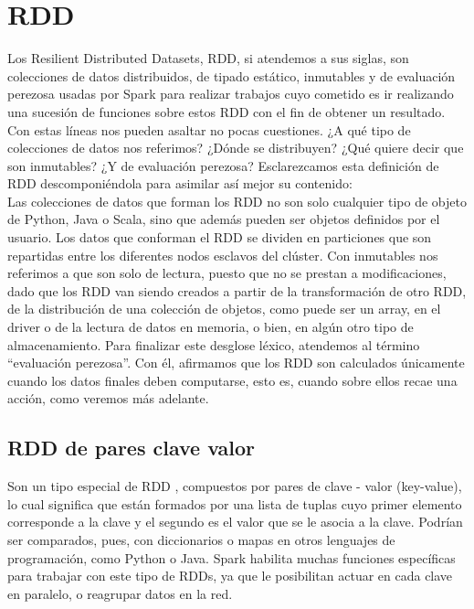\chapter{RDD}

Los Resilient Distributed Datasets, RDD, si atendemos a sus siglas, son colecciones de datos distribuidos, de tipado estático, inmutables y de evaluación perezosa usadas por Spark para realizar trabajos cuyo cometido es ir realizando una sucesión de funciones sobre estos RDD con el fin de obtener un resultado.\\
 
Con estas líneas nos pueden asaltar no pocas cuestiones. ¿A qué tipo de colecciones de datos nos referimos? ¿Dónde se distribuyen? ¿Qué quiere decir que son inmutables? ¿Y de evaluación perezosa? Esclarezcamos esta definición de RDD descomponiéndola para asimilar así mejor su contenido:\\
 
Las colecciones de datos que forman los RDD no son solo cualquier tipo de objeto de Python, Java o Scala, sino que  además pueden ser objetos definidos por el usuario. Los datos que conforman el RDD se dividen en particiones que son repartidas entre los diferentes nodos esclavos del clúster. Con inmutables nos referimos a que son solo de lectura, puesto que no se prestan a modificaciones, dado que los RDD van siendo creados a partir de la transformación de otro RDD, de la distribución de una colección de objetos, como puede ser un array, en el driver o de la lectura de datos en memoria, o bien, en algún otro tipo de almacenamiento. Para finalizar este desglose léxico, atendemos al término “evaluación perezosa”. Con él, afirmamos que los RDD son calculados únicamente cuando los datos finales deben computarse, esto es, cuando sobre ellos recae una acción, como veremos más adelante.\\

\section{RDD de pares clave valor}

Son un tipo especial de RDD \cite{IntroduccionAS}, compuestos por pares de clave - valor (key-value), lo cual significa que están formados por una lista de tuplas cuyo primer elemento corresponde a la clave y el segundo es el valor que se le asocia a la clave. Podrían ser comparados, pues, con diccionarios o mapas en otros lenguajes de programación, como Python o Java. Spark habilita muchas funciones específicas para trabajar con este tipo de RDDs, ya que le posibilitan actuar en cada clave en paralelo, o reagrupar datos en la red.\\

